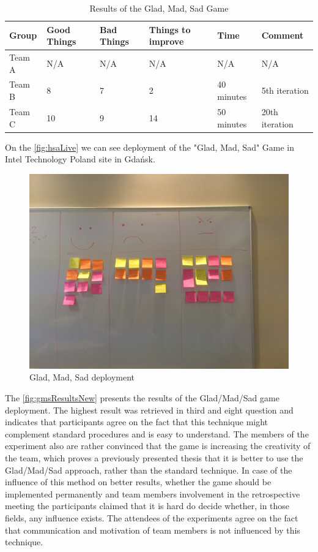 \begin{table}[!htbp]
	\caption{Results of the Glad, Mad, Sad Game}
	\label{tab:groups-gmsResultsN}
	\begin{tabularx}{\textwidth}{|X|X|X|X|X|X|}
	\hline
		Group & Good Things & Bad Things & Things to improve & Time & Comment\\ \hline
		Team A & N/A & N/A & N/A & N/A & N/A\\ \hline
		Team B & 8 & 7 & 2 & 40 minutes & 5th iteration\\ \hline
        Team C & 10 & 9 & 14 & 50 minutes & 20th iteration\\ \hline
	\end{tabularx}
\end{table}

On the \autoref{fig:hsaLive} we can see deployment of the "Glad, Mad, Sad" Game in Intel Technology Poland site in Gdańsk.

\begin{figure}[!htbp]
\caption{Glad, Mad, Sad deployment}
\label{fig:hsaLive}
\centering
\includegraphics[width=1\textwidth]{live/hsaLive}
\end{figure}

The \autoref{fig:gmsResultsNew} presents the results of the Glad/Mad/Sad game deployment. The highest result was retrieved in third and eight question and indicates that participants agree on the fact that this technique might complement standard procedures and is easy to understand. The members of the experiment also are rather convinced that the game is increasing the creativity of the team, which proves a previously presented thesis that it is better to use the Glad/Mad/Sad approach, rather than the standard technique. In case of the influence of this method on better results, whether the game should be implemented permanently and team members involvement in the retrospective meeting the participants claimed that it is hard do decide whether, in those fields, any influence exists. The attendees of the experiments agree on the fact that communication and motivation of team members is not influenced by this technique.    

